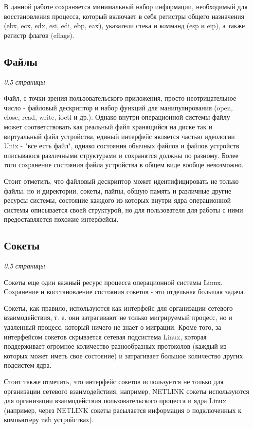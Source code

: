 В данной работе сохраняется минимальный набор информации, необходимый для восстановления процесса, который включает в себя регистры общего назначения (ebx, ecx, edx, esi, edi, ebp, eax), указатели стека и комманд (esp и eip), а также регистр флагов (eflags).

\subsection{Файлы}

\textit{0.5 страницы}

Файл, с точки зрения пользовательского приложения, просто неотрицательное число - файловый дескриптор и набор функций для манипулирования (open, close, read, write, ioctl и др.). Однако внутри операционной системы файлу может соответствовать как реальный файл хранящийся на диске так и виртуальный файл устройства, единый интерфейс является частью идеологии Unix - "все есть файл", однако состояния обычных файлов и файлов устройств описываюся различными структурами и сохранятся должны по разному. Более того сохранение состояния файла устройства в общем виде вообще невозможно.

Стоит отметить, что файловый дескриптор может идентифицировать не только файлы, но и директории, сокеты, пайпы, общую память и различные другие ресурсы системы, состояние каждого из которых внутри ядра операционной системы описывается своей структурой, но для пользователя для работы с ними предоставляется похожие интерфейсы.


\subsection{Сокеты}

\textit{0.5 страницы}

Сокеты еще один важный ресурс процесса операционной системы Linux. Сохранение и восстановление состояния сокетов - это отдельная большая задача.

Сокеты, как правило, используются как интерфейс для организации сетевого взаимодействия, т. е. они затрагивают не только мигрируемый процесс, но и удаленный процесс, который ничего не знает о миграции. Кроме того, за интерфейсом сокетов скрывается сетевая подсистема Linux, которая поддерживает огромное количество разнообразных протоколов (каждый из которых может иметь свое состояние) и затрагивает большое количество других подсистем ядра.

Стоит также отметить, что интерфейс сокетов используется не только для организации сетевого взаимодействия, например, NETLINK сокеты используются для организации взаимодействия пользовательского процесса и ядра Linux (например, через NETLINK сокеты расылается информация о подключенных к компьютеру usb устройствах).
